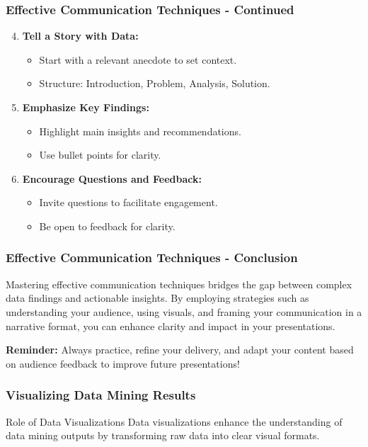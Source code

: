 \documentclass{beamer}
\begin{document}
\begin{frame}[fragile]
    \frametitle{Effective Communication Techniques - Continued}
    \begin{enumerate}
        \setcounter{enumi}{3} %
        \item \textbf{Tell a Story with Data:}
        \begin{itemize}
            \item Start with a relevant anecdote to set context.
            \item Structure: Introduction, Problem, Analysis, Solution.
        \end{itemize}

        \item \textbf{Emphasize Key Findings:}
        \begin{itemize}
            \item Highlight main insights and recommendations.
            \item Use bullet points for clarity.
        \end{itemize}

        \item \textbf{Encourage Questions and Feedback:}
        \begin{itemize}
            \item Invite questions to facilitate engagement.
            \item Be open to feedback for clarity.
        \end{itemize}
    \end{enumerate}
\end{frame}

\begin{frame}[fragile]
    \frametitle{Effective Communication Techniques - Conclusion}
    Mastering effective communication techniques bridges the gap between complex data findings and actionable insights. By employing strategies such as understanding your audience, using visuals, and framing your communication in a narrative format, you can enhance clarity and impact in your presentations.

    \textbf{Reminder:} Always practice, refine your delivery, and adapt your content based on audience feedback to improve future presentations!
\end{frame}

\begin{frame}[fragile]
    \frametitle{Visualizing Data Mining Results}
    \begin{block}{Role of Data Visualizations}
        Data visualizations enhance the understanding of data mining outputs by transforming raw data into clear visual formats.
    \end{block}
\end{frame}
\end{document}
